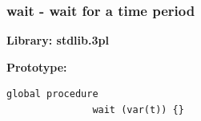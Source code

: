 %
%
%
%
%        
%
%            
%
%

        \subsubsection{wait - wait for a time period}\label{sec:lpwait}

            {\bf Library: stdlib.3pl}

            {\bf Prototype:} \\
            \vsp
            \begin{lstlisting}[gobble=12, language=threepl]
               global procedure
               wait (var(t)) {}
            \end{lstlisting}

